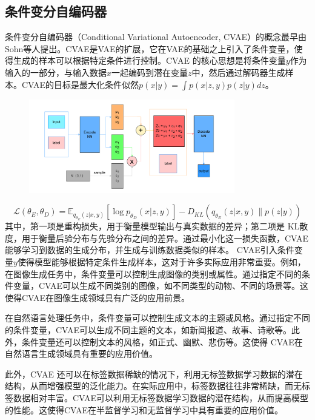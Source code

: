 \subsection{条件变分自编码器}
条件变分自编码器（Conditional Variational Autoencoder, CVAE）的概念最早由Sohn等人提出\cite{SohnLee2015ConditionalVAE}。CVAE是VAE的扩展，它在VAE的基础之上引入了条件变量，使得生成的样本可以根据特定条件进行控制。CVAE 的核心思想是将条件变量$y$作为输入的一部分，与输入数据$x$一起编码到潜在变量$z$中，然后通过解码器生成样本。CVAE的目标是最大化条件似然$p(x|y) = \int p(x|z,y) p(z|y) dz$。
\begin{figure}[htbp]
  \centering
  \includegraphics[width=0.8\textwidth]{Fig/CVAE示意图.drawio.pdf}
\end{figure}
\begin{equation}
  \mathcal{L}(\theta_E, \theta_D) = \mathbb{E}_{q_{\theta_E}(z|x,y)} \left[ \log p_{\theta_D}(x|z,y) \right] - D_{KL}(q_{\theta_E}(z|x,y) \| p(z|y))
  \label{eq:cvae}
\end{equation}
其中，第一项是重构损失，用于衡量模型输出与真实数据的差异；第二项是 KL散度，用于衡量后验分布与先验分布之间的差异。通过最小化这一损失函数，CVAE能够学习到数据的生成分布，并生成与训练数据类似的样本。
CVAE引入条件变量$y$使得模型能够根据特定条件生成样本，这对于许多实际应用非常重要。例如，在图像生成任务中，条件变量可以控制生成图像的类别或属性。通过指定不同的条件变量，CVAE可以生成不同类别的图像，如不同类型的动物、不同的场景等。这使得CVAE在图像生成领域具有广泛的应用前景。

在自然语言处理任务中，条件变量可以控制生成文本的主题或风格。通过指定不同的条件变量，CVAE可以生成不同主题的文本，如新闻报道、故事、诗歌等。此外，条件变量还可以控制文本的风格，如正式、幽默、悲伤等。这使得 CVAE在自然语言生成领域具有重要的应用价值。

此外，CVAE 还可以在标签数据稀缺的情况下，利用无标签数据学习数据的潜在结构，从而增强模型的泛化能力。在实际应用中，标签数据往往非常稀缺，而无标签数据相对丰富。CVAE可以利用无标签数据学习数据的潜在结构，从而提高模型的性能。这使得CVAE在半监督学习和无监督学习中具有重要的应用价值。

